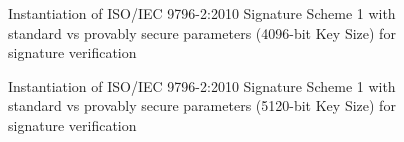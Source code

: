 \documentclass[]{final_report}
\theoremstyle{definition}
\begin{document}
\begin{figure}[H]
    \centering %
     \caption{Instantiation of ISO/IEC 9796-2:2010 Signature Scheme 1 with standard vs provably secure parameters (4096-bit Key Size) for signature verification}
    \begin{minipage}{\textwidth}
        \centering
    \end{minipage}
         \label{iso_verify_4096bit_table}
\end{figure}

\begin{figure}[H]
    \centering %
     \caption{Instantiation of ISO/IEC 9796-2:2010 Signature Scheme 1 with standard vs provably secure parameters (5120-bit Key Size) for signature verification}
    \begin{minipage}{\textwidth}
        \centering
    \end{minipage}
       \label{iso_verify_5120bit_table}
\end{figure}
\end{document}
